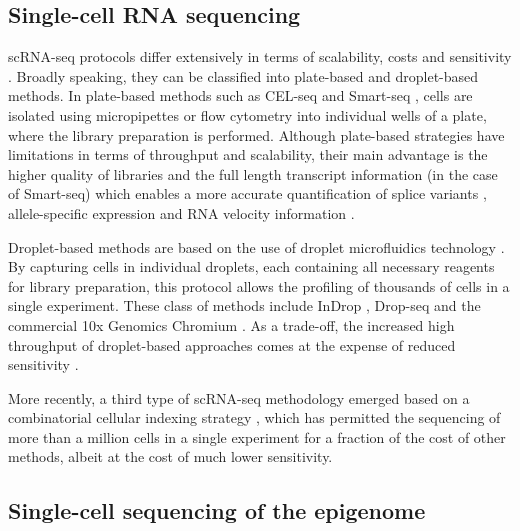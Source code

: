 \subsection{Single-cell RNA sequencing} \label{section:rna_expresssion}

scRNA-seq protocols differ extensively in terms of scalability, costs and sensitivity \cite{Svensson2018, Lafzi2018}. Broadly speaking, they can be classified into plate-based and droplet-based methods. In plate-based methods such as CEL-seq \cite{Hashimshony2012} and Smart-seq \cite{Ramskold2012, Picelli2014}, cells are isolated using micropipettes or flow cytometry into individual wells of a plate, where the library preparation is performed. Although plate-based strategies have limitations in terms of throughput and scalability, their main advantage is the higher quality of libraries and the full length transcript information (in the case of Smart-seq) which enables a more accurate quantification of splice variants \cite{Huang2017}, allele-specific expression \cite{Deng2014} and RNA velocity information \cite{LaManno2018}.
	
Droplet-based methods are based on the use of droplet microfluidics technology \cite{Zhang2019}. By capturing cells in individual droplets, each containing all necessary reagents for library preparation, this protocol allows the profiling of thousands of cells in a single experiment. These class of methods include InDrop \cite{Klein2015,Zilionis2016}, Drop-seq \cite{Macosko2015} and the commercial 10x Genomics Chromium \cite{Zheng2017}. As a trade-off, the increased high throughput of droplet-based approaches comes at the expense of reduced sensitivity \cite{Ziegenhain2017,Wang2019a,Svensson2017}.

More recently, a third type of scRNA-seq methodology emerged based on a combinatorial cellular indexing strategy \cite{Cao2017,Rosenberg2018,Cao2019}, which has permitted the sequencing of more than a million cells in a single experiment for a fraction of the cost of other methods, albeit at the cost of much lower sensitivity.

\subsection{Single-cell sequencing of the epigenome}

